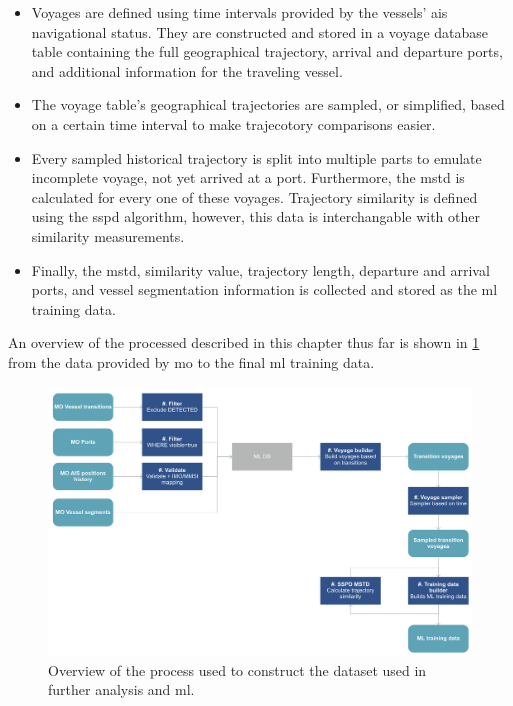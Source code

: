 \begin{itemize}
    \item Voyages are defined using time intervals provided by the vessels' \acrshort{ais} navigational status. They are constructed and stored in a voyage database table containing the full geographical trajectory, arrival and departure ports, and additional information for the traveling vessel.
    \item The voyage table's geographical trajectories are sampled, or simplified, based on a certain time interval to make trajecotory comparisons easier.
    \item Every sampled historical trajectory is split into multiple parts to emulate incomplete voyage, not yet arrived at a port. Furthermore, the \acrshort{mstd} is calculated for every one of these voyages. Trajectory similarity is defined using the \acrshort{sspd} algorithm, however, this data is interchangable with other similarity measurements.
    \item Finally, the \acrshort{mstd}, similarity value, trajectory length, departure and arrival ports, and vessel segmentation information is collected and stored as the \acrshort{ml} training data.
\end{itemize}

An overview of the processed described in this chapter thus far is shown in \cref{fig:dataset_overview} from the data provided by \acrfull{mo} to the final \acrshort{ml} training data.

\begin{figure}[htbp]  %
    \centering
    \includegraphics[width=1.0\textwidth]{figures/dataset_overview}
    \caption{Overview of the process used to construct the dataset used in further analysis and \acrshort{ml}.}
    \label{fig:dataset_overview}
\end{figure}


